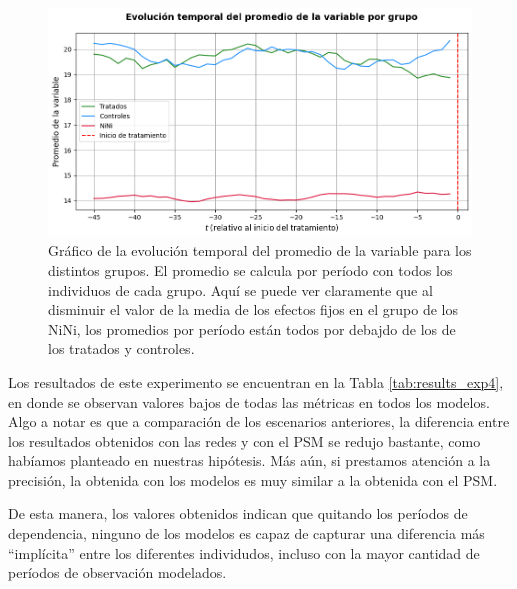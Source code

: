 \documentclass[../../main.tex]{subfiles}
\begin{document}
\begin{figure}[H]
    \centering
    \includegraphics[scale=0.35]{figs/Exp4/promedios_sim13.png}
    \caption{Gráfico de la evolución temporal del promedio de la variable para los
    distintos grupos. El promedio se calcula por período con todos los individuos de cada
    grupo. Aquí se puede ver claramente que al disminuir el valor de la media de los
    efectos fijos en el grupo de los NiNi, los promedios por período están todos por
    debajdo de los de los tratados y controles.}
    \label{fig:mean_time_series_exp4}
\end{figure}

Los resultados de este experimento se encuentran en la Tabla \ref{tab:results_exp4}, en
donde se observan valores bajos de todas las métricas en todos los modelos. Algo a notar
es que a comparación de los escenarios anteriores, la diferencia entre los resultados
obtenidos con las redes y con el PSM se redujo bastante, como habíamos planteado en
nuestras hipótesis. Más aún, si prestamos atención a la precisión, la obtenida con los
modelos es muy similar a la obtenida con el PSM.

De esta manera, los valores obtenidos indican que quitando los períodos de dependencia,
ninguno de los modelos es capaz de capturar una diferencia más ``implícita'' entre los
diferentes individudos, incluso con la mayor cantidad de períodos de observación
modelados.
\end{document}
